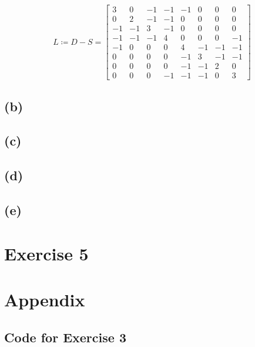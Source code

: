 \documentclass[12pt]{article}
\begin{document}
\begin{equation*}
	L \coloneqq D - S = \left[
	\begin{array}{cccccccc}
		3 & 0 & -1 & -1 & -1 & 0 & 0 & 0 \\
		0 & 2 & -1 & -1 & 0 & 0 & 0 & 0 \\
		-1 & -1 & 3 & -1 & 0 & 0 & 0 & 0 \\
		-1 & -1 & -1 & 4 & 0 & 0 & 0 & -1 \\
		-1 & 0 & 0 & 0 & 4 & -1 & -1 & -1 \\
		0 & 0 & 0 & 0 & -1 & 3 & -1 & -1 \\
		0 & 0 & 0 & 0 & -1 & -1 & 2 & 0 \\
		0 & 0 & 0 & -1 & -1 & -1 & 0 & 3
	\end{array} \right]
\end{equation*}

\subsection*{(b)}
\subsection*{(c)}
\subsection*{(d)}
\subsection*{(e)}

\section*{Exercise 5}


\section*{Appendix}\label{appendix}
\subsection*{Code for Exercise 3}

\end{document}

